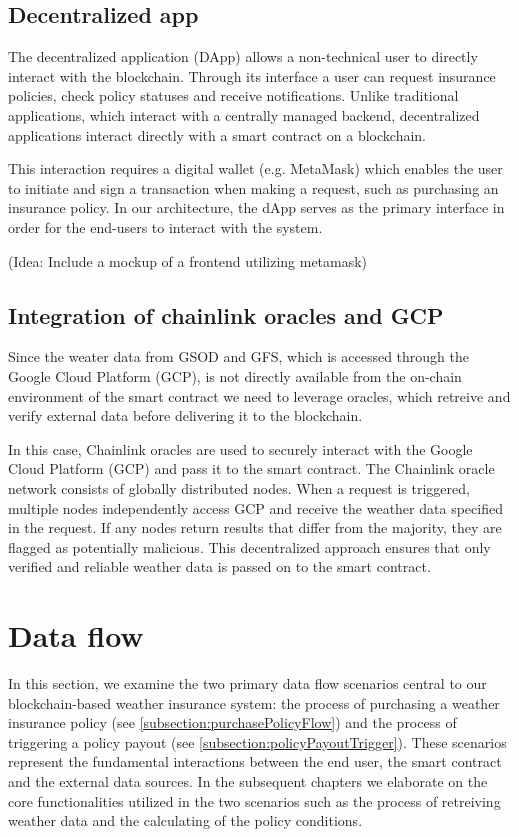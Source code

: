 \subsection{Decentralized app}\label{subsection:decentralizedApp}

The decentralized application (DApp) allows a non-technical user to directly interact with the blockchain. Through its interface a user can request insurance policies, check policy statuses and receive notifications. Unlike traditional applications, which interact with a centrally managed backend, decentralized applications interact directly with a smart contract on a blockchain.

This interaction requires a digital wallet (e.g. MetaMask) which enables the user to initiate and sign a transaction when making a request, such as purchasing an insurance policy. In our architecture, the dApp serves as the primary interface in order for the end-users to interact with the system. 

(Idea: Include a mockup of a frontend utilizing metamask)

\subsection{Integration of chainlink oracles and GCP}\label{subsection:ChainlinkOracle}

Since the weater data from GSOD and GFS, which is accessed through the Google Cloud Platform (GCP), is not directly available from the on-chain environment of the smart contract we need to leverage oracles, which retreive and verify external data before delivering it to the blockchain.

In this case, Chainlink oracles are used to securely interact with the Google Cloud Platform (GCP) and pass it to the smart contract. The Chainlink oracle network consists of globally distributed nodes. When a request is triggered, multiple nodes independently access GCP and receive the weather data specified in the request. If any nodes return results that differ from the majority, they are flagged as potentially malicious. This decentralized approach ensures that only verified and reliable weather data is passed on to the smart contract.


\section{Data flow}

In this section, we examine the two primary data flow scenarios central to our blockchain-based weather insurance system: the process of purchasing a weather insurance policy (see \cref{subsection:purchasePolicyFlow}) and the process of triggering a policy payout (see \cref{subsection:policyPayoutTrigger}). These scenarios represent the fundamental interactions between the end user, the smart contract and the external data sources. In the subsequent chapters we elaborate on the core functionalities utilized in the two scenarios such as the process of retreiving weather data and the calculating of the policy conditions.


